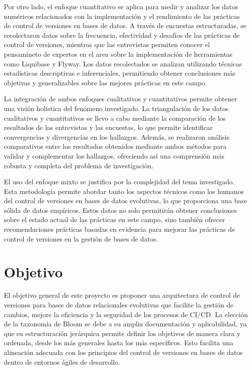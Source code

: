 \documentclass{IEEEtran}
\begin{document}
Por otro lado, el enfoque cuantitativo se aplica para medir y analizar los datos numéricos relacionados con la implementación y el rendimiento de las prácticas de control de versiones en bases de datos. A través de encuestas estructuradas, se recolectaron datos sobre la frecuencia, efectividad y desafíos de las prácticas de control de versiones, mientras que las entrevistas permiten conocer el pensamineto de expertos en el area sobre la implementación de herramientas como Liquibase y Flyway. Los datos recolectados se analizan utilizando técnicas estadísticas descriptivas e inferenciales, permitiendo obtener conclusiones más objetivas y generalizables sobre las mejores prácticas en este campo.

La integración de ambos enfoques cualitativos y cuantitativos permite obtener una visión holística del fenómeno investigado. La triangulación de los datos cualitativos y cuantitativos se llevo a cabo mediante la comparación de los resultados de las entrevistas y las encuestas, lo que permite identificar convergencias y divergencias en los hallazgos. Además, se realizaron análisis comparativos entre los resultados obtenidos mediante ambos métodos para validar y complementar los hallazgos, ofreciendo así una comprensión más robusta y completa del problema de investigación.

El uso del enfoque mixto se justifica por la complejidad del tema investigado. Esta metodología permite abordar tanto los aspectos técnicos como los humanos del control de versiones en bases de datos evolutivas, lo que proporciona una base sólida de datos empíricos. Estos datos no solo permitirán obtener conclusiones sobre el estado actual de las prácticas en este campo, sino también ofrecer recomendaciones prácticas basadas en evidencia para mejorar las prácticas de control de versiones en la gestión de bases de datos.
    
\section{Objetivo}
El objetivo general de este proyecto es proponer una arquitectura de control de versiones para bases de datos relacionales evolutivas que facilite la gestión de cambios, mejore la eficiencia y la seguridad de los procesos de CI/CD. La elección de la taxonomía de Bloom \cite{TBloom} se debe a su amplia documentación y aplicabilidad, ya que su estructuración jerárquica permite definir los objetivos de manera clara y ordenada, desde los más generales hasta los más específicos. Esto facilita una alineación adecuada con los principios del control de versiones en bases de datos dentro de entornos ágiles de desarrollo.
\end{document}

